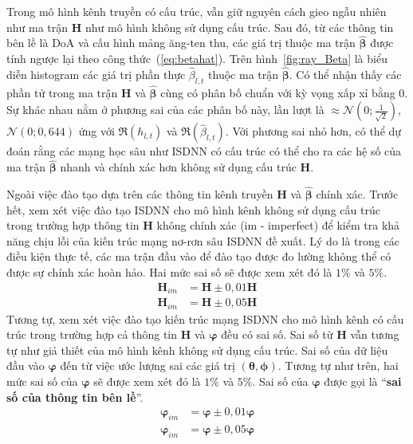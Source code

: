 Trong mô hình kênh truyền có cấu trúc, vẫn giữ nguyên cách gieo ngẫu nhiên như ma trận $\mathbf{H}$ như mô hình không sử dụng cấu trúc. Sau đó, từ các thông tin bên lề là DoA và cấu hình mảng ăng-ten thu, các giá trị thuộc ma trận $\hat{\boldsymbol{\beta}}$ được tính ngược lại theo công thức~(\ref{eq:betahat}). Trên hình~\ref{fig:ray_Beta} là biểu diễn histogram các giá trị phần thực $\hat{\beta}_{l, t}$ thuộc ma trận $\hat{\boldsymbol{\beta}}$. Có thể nhận thấy các phần tử trong ma trận $\mathbf{H}$ và $\hat{\boldsymbol{\beta}}$ cùng có phân bố chuẩn với kỳ vọng xấp xỉ bằng $0$. Sự khác nhau nằm ở phương sai của các phân bố này, lần lượt là $\approx \mathcal{N} (0; \frac{1}{\sqrt{2}})$, $\mathcal{N} (0; 0,644)$ ứng với $\Re(h_{l, t})$ và $\Re(\hat{\beta}_{l, t})$. Với phương sai nhỏ hơn, có thể dự đoán rằng các mạng học sâu như ISDNN có cấu trúc có thể cho ra các hệ số của ma trận $\hat{\boldsymbol{\beta}}$ nhanh và chính xác hơn không sử dụng cấu trúc $\mathbf{H}$.

Ngoài việc đào tạo dựa trên các thông tin kênh truyền $\mathbf{H}$ và $\hat{\boldsymbol{\beta}}$ chính xác. Trước hết, xem xét việc đào tạo ISDNN cho mô hình kênh không sử dụng cấu trúc trong trường hợp thông tin $\mathbf{H}$ không chính xác (im - imperfect) để kiểm tra khả năng chịu lỗi của kiến trúc mạng nơ-rơn sâu ISDNN đề xuất. Lý do là trong các điều kiện thực tế, các ma trận đầu vào để đào tạo được đo lường không thể có được sự chính xác hoàn hảo. Hai mức sai số sẽ được xem xét đó là $1\%$ và $5\%$.
\begin{equation}
\begin{aligned}
     \mathbf{H}_{im} &= \mathbf{H} \pm 0,01\mathbf{H} \\
     \mathbf{H}_{im} &= \mathbf{H} \pm 0,05\mathbf{H}
\end{aligned}
\end{equation}
Tương tự, xem xét việc đào tạo kiến trúc mạng ISDNN cho mô hình kênh có cấu trúc trong trường hợp cả thông tin $\mathbf{H}$ và ${\boldsymbol{\varphi}}$ đều có sai số. Sai số từ $\mathbf{H}$ vẫn tương tự như giả thiết của mô hình kênh không sử dụng cấu trúc. Sai số của dữ liệu đầu vào ${\boldsymbol{\varphi}}$ đến từ việc ước lượng sai các giá trị $(\boldsymbol{\theta}, \boldsymbol{\phi})$. Tương tự như trên, hai mức sai số của ${\boldsymbol{\varphi}}$ sẽ được xem xét đó là $1\%$ và $5\%$. Sai số của ${\boldsymbol{\varphi}}$ được gọi là ``\textbf{sai số của thông tin bên lề}''.
\begin{equation}
    \begin{aligned}
         {\boldsymbol{\varphi}}_{im} &= {\boldsymbol{\varphi}} \pm 0,01{\boldsymbol{\varphi}} \\
         {\boldsymbol{\varphi}}_{im} &= {\boldsymbol{\varphi}} \pm 0,05{\boldsymbol{\varphi}}
    \end{aligned}
\end{equation}

